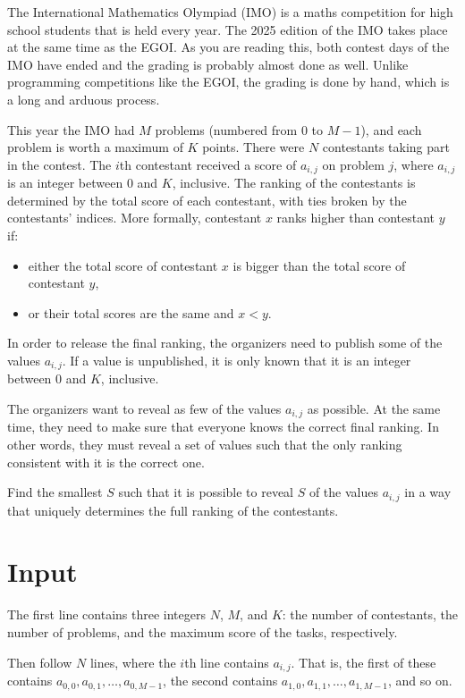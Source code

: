 
The International Mathematics Olympiad (IMO) is a maths competition for high school
students that is held every year. The 2025 edition of the IMO takes place at the same time as the EGOI.
As you are reading this, both contest days of the IMO have ended and the grading is probably almost done as well.
Unlike programming competitions like the EGOI, the grading is done by hand,
which is a long and arduous process.

This year the IMO had $M$ problems (numbered from $0$ to $M-1$), and each problem is worth a maximum of $K$ points.  There were $N$ contestants 
taking part in the contest. The $i$th contestant received a score of $a_{i,j}$ on problem $j$, 
where $a_{i,j}$ is an integer between $0$ and $K$, inclusive. The ranking of the contestants is determined by the total score of each contestant,
with ties broken by the contestants' indices. More formally, contestant $x$ ranks higher than contestant $y$ if:

\begin{itemize}
\item either the total score of contestant $x$ is bigger than the total score of contestant $y$,
\item or their total scores are the same and $x < y$.
\end{itemize}

In order to release the final ranking, the organizers need to publish some of the values $a_{i,j}$.
If a value is unpublished, it is only known that it is an integer between $0$ and $K$, inclusive.

The organizers want to reveal as few of the values $a_{i,j}$ as possible.
At the same time, they need to make sure that everyone knows the correct final ranking.
In other words, they must reveal a set of values such that the only ranking consistent with it is the correct one.

Find the smallest $S$ such that it is possible to reveal $S$ of the values $a_{i,j}$ in a way that uniquely determines the full ranking of the contestants.

\section*{Input}
The first line contains three integers $N$, $M$, and $K$: the number of contestants, the number of problems, and the maximum score of the tasks, respectively.

Then follow $N$ lines, where the $i$th line contains $a_{i,j}$. That is, the first of these contains $a_{0,0}, a_{0,1}, \ldots, a_{0, M-1}$, the second contains $a_{1,0}, a_{1,1}, \ldots, a_{1, M-1}$, 
and so on.

